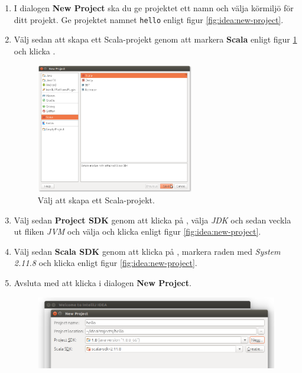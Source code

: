 \begin{enumerate}
\item I dialogen \textbf{New Project} ska du ge projektet ett namn och välja körmiljö för ditt projekt. Ge projektet namnet \texttt{hello} enligt figur \ref{fig:idea:new-project}. 

\item Välj sedan att skapa ett Scala-projekt genom att markera \textbf{Scala} enligt figur \ref{fig:idea:new-scala-project} och klicka .

\begin{figure}[H]
\centering
\includegraphics[width=0.65\textwidth]{../img/intellij/idea-new-scala-project.png} 
\caption{Välj att skapa ett Scala-projekt.}
\label{fig:idea:new-scala-project}
\end{figure}

\item Välj sedan \textbf{Project SDK} genom att klicka på , välja \textit{JDK} och sedan veckla ut fliken \textit{JVM} och  välja  och klicka  enligt  figur \ref{fig:idea:new-project}.

\item Välj sedan \textbf{Scala SDK} genom att klicka på , markera raden med \textit{System 2.11.8} och klicka  enligt  figur \ref{fig:idea:new-project}.

\item Avsluta med att klicka  i dialogen \textbf{New Project}.

\begin{figure}[H]
\centering
\includegraphics[width=1.0\textwidth]{../img/intellij/idea-new-project.png} 


\end{figure}
\end{enumerate}
